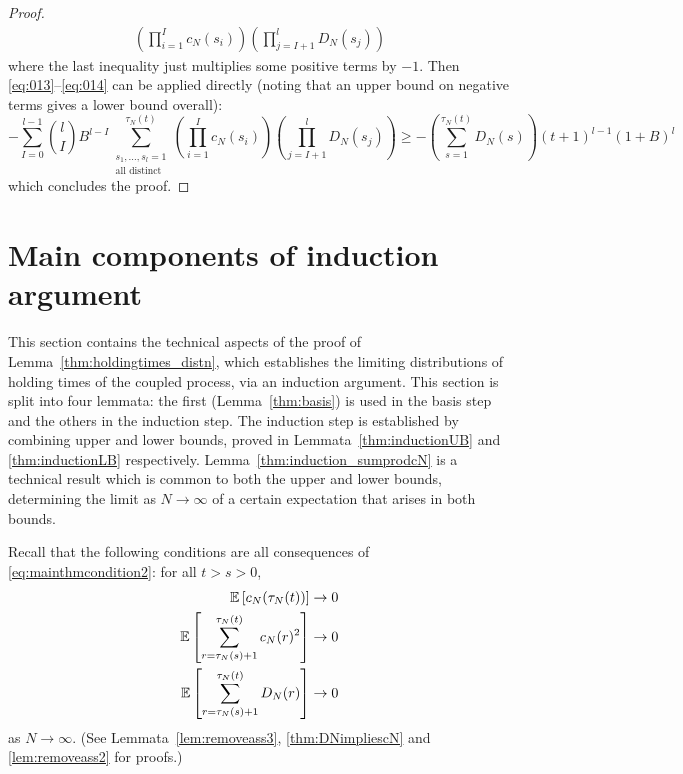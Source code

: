 \begin{proof}
\begin{align*}
        \left( \prod_{i=1}^I c_N(s_i) \right) \left( \prod_{j=I+1}^l D_N(s_j) \right)
\end{align*}
where the last inequality just multiplies some positive terms by $-1$.
Then \eqref{eq:013}--\eqref{eq:014} can be applied directly (noting that an upper bound on negative terms gives a lower bound overall):
\begin{equation*}
- \sum_{I=0}^{l-1} \binom{l}{I} B^{l-I} 
        \sum_{\substack{ s_1, \dots, s_l =1 \\ \text{all distinct} }}^{\tau_N(t)}
        \left( \prod_{i=1}^I c_N(s_i) \right) \left( \prod_{j=I+1}^l D_N(s_j) \right)
\geq - \left( \sum_{s=1}^{\tau_N(t)} D_N(s) \right) (t+1)^{l-1} (1+B)^l 
\end{equation*}
which concludes the proof.
\end{proof}




\section{Main components of induction argument}
This section contains the technical aspects of the proof of Lemma~\ref{thm:holdingtimes_distn}, which establishes the limiting distributions of holding times of the coupled process, via an induction argument.
This section is split into four lemmata: the first (Lemma~\ref{thm:basis}) is used in the basis step and the others in the induction step. The induction step is established by combining upper and lower bounds, proved in Lemmata~\ref{thm:inductionUB} and \ref{thm:inductionLB} respectively. Lemma~\ref{thm:induction_sumprodcN} is a technical result which is common to both the upper and lower bounds, determining the limit as $N\to\infty$ of a certain expectation that arises in both bounds.

Recall that the following conditions are all consequences of \eqref{eq:mainthmcondition2}: for all $t>s>0$,
\begin{align}
\mathbb{E} \left[ c_N(\tau_N(t)) \right] &\rightarrow 0 \label{eq:BJJK_eq3.3}\\
\mathbb{E}\left[ \sum_{r=\tau_N(s)+1}^{\tau_N(t)} c_N(r)^2 \right] &\rightarrow 0
        \label{eq:BJJK_eq3.5}\\
\mathbb{E}\left[ \sum_{r=\tau_N(s)+1}^{\tau_N(t)} D_N(r) \right] &\rightarrow 0
        \label{eq:BJJK_eq3.4}
\end{align}
as $N\to\infty$. (See Lemmata~\ref{lem:removeass3}, \ref{thm:DNimpliescN} and \ref{lem:removeass2} for proofs.)



